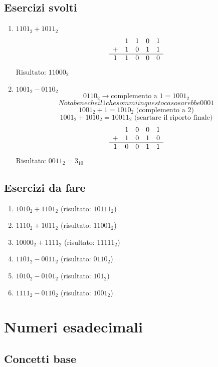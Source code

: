 \documentclass[12pt,a4paper]{article}
\begin{document}
\subsection{Esercizi svolti}
\begin{enumerate}
    \item $1101_2 + 1011_2$
    \[\begin{array}{c c c c c}
     & 1 & 1 & 0 & 1 \\
    + & 1 & 0 & 1 & 1 \\
    \hline
    1 & 1 & 0 & 0 & 0
    \end{array}\]
    Risultato: $11000_2$

    \item $1001_2 - 0110_2$
    \[
    0110_2 \rightarrow \text{complemento a 1} = 1001_2
    \]
    \[
    Nota bene che il 1 che sommi in questo caso sarebbe 0001
    \]
    \[
    1001_2 + 1 = 1010_2 \text{ (complemento a 2)}
    \]
    \[
    1001_2 + 1010_2 = 10011_2 \text{ (scartare il riporto finale)}
    \]
    \[
    \begin{array}{c c c c c}
        & 1 & 0 & 0 & 1 \\
    +   & 1 & 0 & 1 & 0 \\
    \hline
    1 & 0 & 0 & 1 & 1
    \end{array}
    \]
    Risultato: $0011_2 = 3_{10}$
\end{enumerate}

\subsection{Esercizi da fare}
\begin{enumerate}
    \item $1010_2 + 1101_2$ (risultato: $10111_2$)
    \item $1110_2 + 1011_2$ (risultato: $11001_2$)
    \item $10000_2 + 1111_2$ (risultato: $11111_2$)
    \item $1101_2 - 0011_2$ (risultato: $0110_2$)
    \item $1010_2 - 0101_2$ (risultato: $101_2$)
    \item $1111_2 - 0110_2$ (risultato: $1001_2$)
\end{enumerate}

\newpage
\section{Numeri esadecimali}

\subsection{Concetti base}
\end{document}
